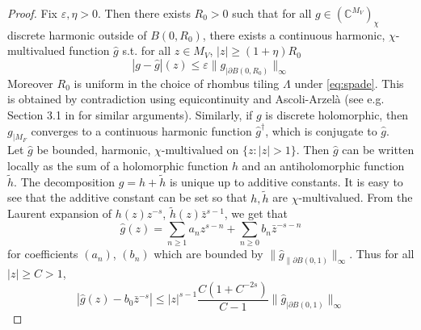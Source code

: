 \documentclass[10pt]{article}
\newcommand{\C}{\mathbb{C}}
\newcommand{\eps}{\varepsilon}
\newcommand{\dg}{\dagger}
\begin{document}
\begin{proof}
Fix $\eps,\eta>0$. Then there exists $R_0>0$ such that for all $g\in (\C^{M_V})_\chi$ discrete harmonic outside of $B(0,R_0)$, there exists a continuous harmonic, $\chi$-multivalued function $\hat g$ s.t. for all $z\in M_V$, $|z|\geq (1+\eta)R_0$
\begin{equation}\label{eq:Lemmoninf1}
|g-\hat g|(z)\leq \eps \|g_{|{\partial B(0,R_0)}}\|_\infty
\end{equation}
Moreover $R_0$ is uniform in the choice of rhombus tiling $\Lambda$ 
under \eqref{eq:spade}. This is obtained by contradiction using equicontinuity and Ascoli-Arzel\`a (see e.g. Section 3.1 in \cite{SmiChe_isoradial} for similar arguments). Similarly, if $g$ is discrete holomorphic, then $g_{|M_F}$ converges to a continuous harmonic function $\hat g^\dg$, which is conjugate to $\hat g$.\\

Let $\hat g$ be bounded, harmonic, $\chi$-multivalued on $\{z:|z|>1\}$. Then $\hat g$ can be written locally as the sum of a holomorphic function $h$ and an antiholomorphic function $\tilde h$. The decomposition $\hat g=h+\tilde h$ is unique up to additive constants. It is easy to see that the additive constant can be set so that $h,\tilde h$ are $\chi$-multivalued. From the Laurent expansion of $h(z)z^{-s}$, $\tilde h(z)\bar z^{s-1}$, we get that
$$\hat g(z)=\sum_{n\geq 1}a_n z^{s-n}+\sum_{n\geq 0}b_n \bar z^{-s-n}$$
for coefficients $(a_n)$, $(b_n)$ which are bounded by $\|\hat g_{\|\partial B(0,1)}\|_\infty$. Thus for all $|z|\geq C>1$,
$$|\hat g(z)-b_0\bar z^{-s}|\leq |z|^{s-1}\frac {C(1+C^{-2s})}{C-1}\|\hat g_{|\partial B(0,1)}\|_\infty$$


\end{proof}
\end{document}
